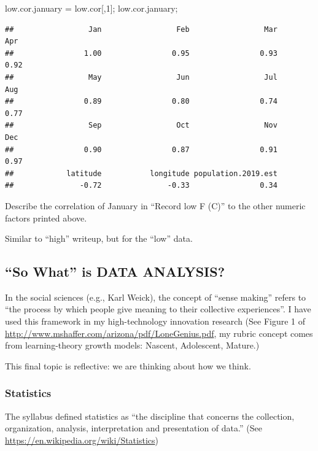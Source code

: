 \documentclass[
]{article}
\newenvironment{Shaded}{\begin{snugshade}}{\end{snugshade}}
\newcommand{\DecValTok}[1]{\textcolor[rgb]{0.00,0.00,0.81}{#1}}
\newcommand{\NormalTok}[1]{#1}
\newcommand{\StringTok}[1]{\textcolor[rgb]{0.31,0.60,0.02}{#1}}
\begin{document}
\begin{Shaded}
\begin{Highlighting}[]
\NormalTok{low.cor.january =}\StringTok{ }\NormalTok{low.cor[,}\DecValTok{1}\NormalTok{];}
\NormalTok{low.cor.january;}
\end{Highlighting}
\end{Shaded}

\begin{verbatim}
##                 Jan                 Feb                 Mar                 Apr 
##                1.00                0.95                0.93                0.92 
##                 May                 Jun                 Jul                 Aug 
##                0.89                0.80                0.74                0.77 
##                 Sep                 Oct                 Nov                 Dec 
##                0.90                0.87                0.91                0.97 
##            latitude           longitude population.2019.est 
##               -0.72               -0.33                0.34
\end{verbatim}

Describe the correlation of January in ``Record low F (C)'' to the other
numeric factors printed above.

Similar to ``high'' writeup, but for the ``low'' data.

\hypertarget{so-what-is-data-analysis}{%
\subsection{``So What'' is DATA
ANALYSIS?}\label{so-what-is-data-analysis}}

In the social sciences (e.g., Karl Weick), the concept of ``sense
making'' refers to ``the process by which people give meaning to their
collective experiences''. I have used this framework in my
high-technology innovation research (See Figure 1 of
\url{http://www.mshaffer.com/arizona/pdf/LoneGenius.pdf}, my rubric
concept comes from learning-theory growth models: Nascent, Adolescent,
Mature.)

This final topic is reflective: we are thinking about how we think.

\hypertarget{statistics}{%
\subsubsection{Statistics}\label{statistics}}

The syllabus defined statistics as ``the discipline that concerns the
collection, organization, analysis, interpretation and presentation of
data.'' (See \url{https://en.wikipedia.org/wiki/Statistics})
\end{document}
